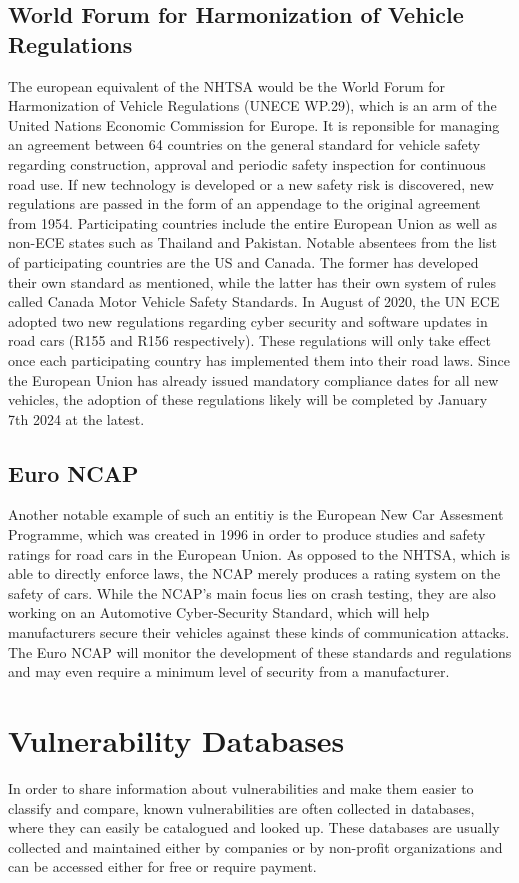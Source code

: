 \subsection{World Forum for Harmonization of Vehicle Regulations}
The european equivalent of the NHTSA would be the World Forum for Harmonization of Vehicle Regulations (UNECE WP.29), which is an arm of the United Nations Economic Commission for Europe. It is reponsible for managing an agreement between 64 countries on the general standard for vehicle safety regarding construction, approval and periodic safety inspection for continuous road use. If new technology is developed or a new safety risk is discovered, new regulations are passed in the form of an appendage to the original agreement from 1954.
Participating countries include the entire European Union as well as non-ECE states such as Thailand and Pakistan. Notable absentees from the list of participating countries are the US and Canada. The former has developed their own standard as mentioned, while the latter has their own system of rules called Canada Motor Vehicle Safety Standards. \cite{unece} %
In August of 2020, the UN ECE adopted two new regulations regarding cyber security and software updates in road cars (R155 and R156 respectively). These regulations will only take effect once each participating country has implemented them into their road laws. Since the European Union has already issued mandatory compliance dates for all new vehicles, the adoption of these regulations likely will be completed by January 7th 2024 at the latest.

\subsection{Euro NCAP}
Another notable example of such an entitiy is the European New Car Assesment Programme, which was created in 1996 in order to produce studies and safety ratings for road cars in the European Union. As opposed to the NHTSA, which is able to directly enforce laws, the NCAP merely produces a rating system on the safety of cars. While the NCAP's main focus lies on crash testing, they are also working on an Automotive Cyber-Security Standard, which will help manufacturers secure their vehicles against these kinds of communication attacks. The Euro NCAP will monitor the development of these standards and regulations and may even require a minimum level of security from a manufacturer.\cite{ncaproadmap}

\section{Vulnerability Databases}
In order to share information about vulnerabilities and make them easier to classify and compare, known vulnerabilities are often collected in databases, where they can easily be catalogued and looked up. These databases are usually collected and maintained either by companies or by non-profit organizations and can be accessed either for free or require payment.
